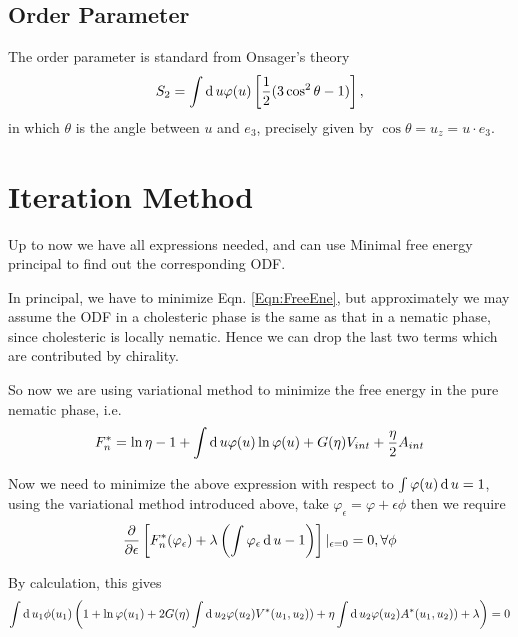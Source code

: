 \subsection{Order Parameter}
The order parameter is standard from Onsager's theory
\begin{equation}
	S_2=\int \operatorname{d}u\varphi(u)\left[\frac{1}{2}(3\cos^2\theta -1)\right],
\end{equation}
in which $\theta$ is the angle between $u$ and $e_3$, precisely given by $\cos\theta = u_z = u\cdot e_3$.

\section{Iteration Method}\label{Sec:Iter}
Up to now we have all expressions needed, and can use Minimal free energy principal to find out the corresponding ODF.

In principal, we have to minimize Eqn. \ref{Eqn:FreeEne}, but approximately we may assume the ODF in a cholesteric phase is the same as that in a nematic phase, since cholesteric is locally nematic. Hence we can drop the last two terms which are contributed by chirality.

So now we are using variational method to minimize the free energy in the pure nematic phase, i.e.
\begin{equation}
	F_{n}^*=\ln\eta -1+\int\operatorname{d}u\varphi(u)\ln \varphi(u)+G(\eta)V_{int}+\frac{\eta}{2}A_{int}
\end{equation}

Now we need to minimize the above expression with respect to $\int\varphi(u)\operatorname{d}u=1$, using the variational method introduced above, take $\varphi_{\epsilon}=\varphi+\epsilon\phi$ then we require
\begin{equation}
	\frac{\partial}{\partial\epsilon}\left[F_{n}^*(\varphi_{\epsilon})+\lambda\left(\int \varphi_{\epsilon}\operatorname{d}u-1\right)\right]|_{\epsilon=0}=0, \forall \phi
\end{equation}

By calculation, this gives
\begin{equation}
	\int\operatorname{d}u_1\phi(u_1)\left(1+\ln \varphi(u_1)+2G(\eta)\int\operatorname{d}u_2\varphi(u_2)V^*(u_1,u_2))+\eta\int\operatorname{d}u_2\varphi(u_2)A^*(u_1,u_2))+\lambda\right)=0
\end{equation}

